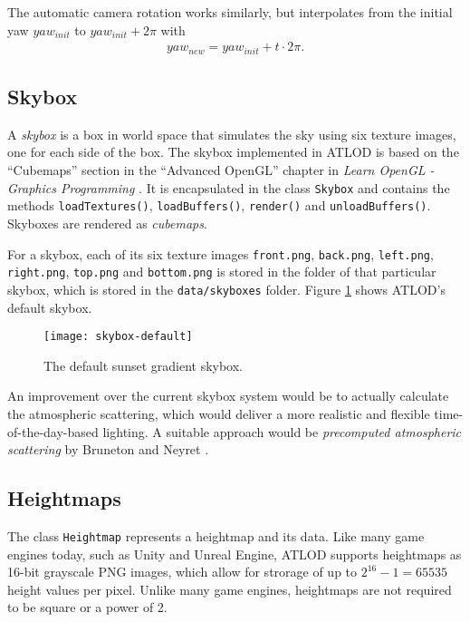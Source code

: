 The automatic camera rotation works similarly, but interpolates from the initial yaw $yaw_{init}$ to
$yaw_{init} + 2\pi$ with
\begin{align*}
  yaw_{new} = yaw_{init} + t \cdot 2\pi. 
\end{align*}

\subsection{Skybox}
A \textit{skybox} is a box in world space that simulates the sky using
six texture images, one for each side of the box. 
The skybox implemented in ATLOD is based on the ``Cubemaps'' section in the ``Advanced OpenGL'' chapter in \textit{Learn OpenGL - Graphics Programming} \cite{learnopengl}.
It is encapsulated in the class \texttt{Skybox} and 
contains the methods \texttt{loadTextures()}, \texttt{loadBuffers()}, \texttt{render()}
and \texttt{unloadBuffers()}. Skyboxes are rendered 
as \textit{cubemaps}.

For a skybox, each of its six texture images \texttt{front.png},
\texttt{back.png}, \texttt{left.png}, \texttt{right.png},
\texttt{top.png} and \texttt{bottom.png} 
is stored in the folder of that particular skybox, which is stored in 
the \texttt{data/skyboxes} folder. Figure \ref{fig:skybox} shows ATLOD's default skybox.

\begin{figure}[H]
  \centering
  \texttt{[image: skybox-default]}
  \caption{The default sunset gradient skybox.}\label{fig:skybox}
\end{figure}

An improvement over the current skybox system would be to actually calculate the atmospheric scattering,
which would deliver a more realistic and flexible time-of-the-day-based lighting.
A suitable approach would be \textit{precomputed atmospheric scattering} by Bruneton and Neyret \cite{precomputedatmosphericscattering}.

\subsection{Heightmaps}
The class \texttt{Heightmap} represents a heightmap and its data.
Like many game engines today, such as Unity and Unreal Engine, ATLOD supports heightmaps as 16-bit grayscale PNG images, 
which allow for strorage of up to $2^{16}-1=65535$ height values per pixel. 
Unlike many game engines, heightmaps are not required to be square or a power of 2.

